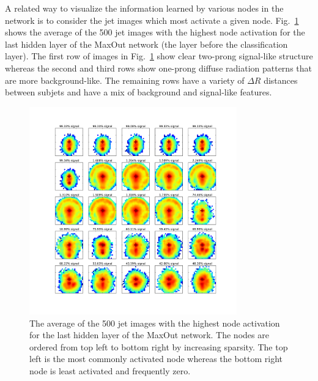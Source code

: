 A related way to visualize the information learned by various nodes in the network is to consider the jet images which most activate a given node.  Fig.~\ref{fig:mostactiviate} shows the average of the 500 jet images with the highest node activation  for the last hidden layer of the MaxOut network (the layer before the classification layer).  The first row of images in Fig.~\ref{fig:mostactiviate} show clear two-prong signal-like structure whereas the second and third rows show one-prong diffuse radiation patterns that are more background-like.  The remaining rows have a variety of $\Delta R$ distances between subjets and have a mix of background and signal-like features.


\begin{figure}[!htbp]
  \centering
  \includegraphics[width=0.8\textwidth]{figures/maxnodes.pdf}
  \caption{The average of the 500 jet images with the highest node activation  for the last hidden layer of the MaxOut network.  The nodes are ordered from top left to bottom right by increasing sparsity.  The top left is the most commonly activated node whereas the bottom right node is least activated and frequently zero. }
  \label{fig:mostactiviate}
\end{figure}


